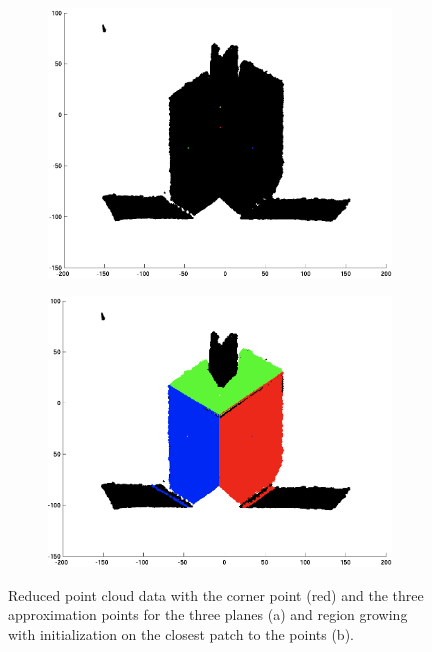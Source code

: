 \begin{figure}[H]
	\centering
	\begin{subfigure}[b]{0.45\textwidth}
		\centering
		\includegraphics[width=\textwidth]{Images/4-Points(1).png}
		\caption{}
		\label{fig:points}
	\end{subfigure}%
	\hspace{1cm}
	\begin{subfigure}[b]{0.45\textwidth}
		\centering
		\includegraphics[width=\textwidth]{Images/5-RegionGrowing(1).png}
		\caption{}
		\label{fig:regionGrowing}
	\end{subfigure}
	\caption{Reduced point cloud data with the corner point (red) and the three approximation points for the three planes (a) and region growing with initialization on the closest patch to the points (b).}
\end{figure}

